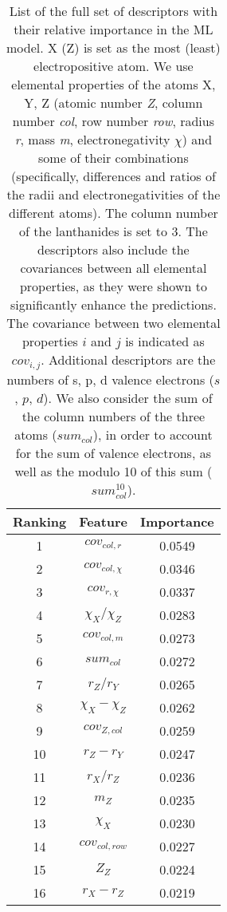 \documentclass[pt10,journal=jacsat,manuscript=article,layout=twocolumn]{achemso}
\begin{document}
\begin{table*}
\caption{List of the full set of descriptors with their relative importance in the ML model. X (Z) is set as the most (least) electropositive atom. We use elemental properties of the atoms X, Y, Z (atomic number \textit{Z}, column number \textit{col}, row number \textit{row}, radius \textit{r}, mass \textit{m}, electronegativity $\chi$) and some of their combinations (specifically, differences and ratios of the radii and electronegativities of the different atoms). The column number of the lanthanides is set to 3. The descriptors also include the covariances between all elemental properties, as they were shown to significantly enhance the predictions\cite{Representationofcompoundsformachinelearning}. The covariance between two elemental properties $i$ and $j$ is indicated as $cov_{i,j}$. Additional descriptors are the numbers of s, p, d valence electrons ($s$, $p$, $d$). We also consider the sum of the column numbers of the three atoms ($sum_{col}$), in order to account for the sum of valence electrons, as well as the modulo 10 of this sum ($sum_{col}^{10}$).}
\centering
\scriptsize
\begin{minipage}{0.25\textwidth}
\begin{tabular}{ccc}
\toprule
  Ranking & Feature & Importance\\
\midrule
1 & $cov_{col,r}$     &       0.0549\\
2 & $cov_{col,\chi}$     &       0.0346\\
3 & $cov_{r,\chi}$     &       0.0337\\
4 & $\chi_X/\chi_Z$     &       0.0283\\
5 & $cov_{col,m}$     &       0.0273\\
6 & $sum_{col}$     &       0.0272\\
7 & $r_Z/r_Y$     &       0.0265\\
8 & $\chi_X-\chi_Z$     &       0.0262\\
9 & $cov_{Z,col}$     &       0.0259\\
10 & $r_Z-r_Y$     &       0.0247\\
11 & $r_X/r_Z$     &       0.0236\\
12 & $m_Z$     &       0.0235\\
13 & $\chi_X$     &       0.0230\\
14 & $cov_{col,row}$     &       0.0227\\
15 & $Z_Z$     &       0.0224\\
16 & $r_X-r_Z$     &       0.0219\\

\end{tabular}
\end{minipage}
\end{table*}
\end{document}
